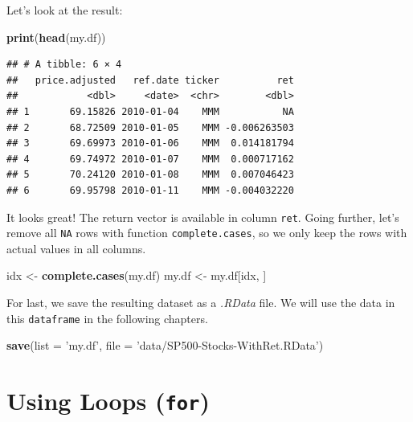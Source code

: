 \documentclass[11pt,]{book}
\newenvironment{Shaded}{\begin{snugshade}}{\end{snugshade}}
\newcommand{\KeywordTok}[1]{\textcolor[rgb]{0.27,0.27,0.27}{\textbf{#1}}}
\newcommand{\DataTypeTok}[1]{\textcolor[rgb]{0.27,0.27,0.27}{#1}}
\newcommand{\StringTok}[1]{\textcolor[rgb]{0.5,0.5,0.5}{#1}}
\newcommand{\NormalTok}[1]{#1}
\begin{document}
Let's look at the result:

\begin{Shaded}
\begin{Highlighting}[]
\KeywordTok{print}\NormalTok{(}\KeywordTok{head}\NormalTok{(my.df))}
\end{Highlighting}
\end{Shaded}

\begin{verbatim}
## # A tibble: 6 × 4
##   price.adjusted   ref.date ticker          ret
##            <dbl>     <date>  <chr>        <dbl>
## 1       69.15826 2010-01-04    MMM           NA
## 2       68.72509 2010-01-05    MMM -0.006263503
## 3       69.69973 2010-01-06    MMM  0.014181794
## 4       69.74972 2010-01-07    MMM  0.000717162
## 5       70.24120 2010-01-08    MMM  0.007046423
## 6       69.95798 2010-01-11    MMM -0.004032220
\end{verbatim}

It looks great! The return vector is available in column \texttt{ret}.
Going further, let's remove all \texttt{NA} rows with function
\texttt{complete.cases}, so we only keep the rows with actual values in
all columns. 

\begin{Shaded}
\begin{Highlighting}[]
\NormalTok{idx <-}\StringTok{ }\KeywordTok{complete.cases}\NormalTok{(my.df)}
\NormalTok{my.df <-}\StringTok{ }\NormalTok{my.df[idx, ]}
\end{Highlighting}
\end{Shaded}

For last, we save the resulting dataset as a \emph{.RData} file. We will
use the data in this \texttt{dataframe} in the following chapters.

\begin{Shaded}
\begin{Highlighting}[]
\KeywordTok{save}\NormalTok{(}\DataTypeTok{list =} \StringTok{'my.df'}\NormalTok{, }
     \DataTypeTok{file =} \StringTok{'data/SP500-Stocks-WithRet.RData'}\NormalTok{)}
\end{Highlighting}
\end{Shaded}

\section{\texorpdfstring{Using Loops
(\texttt{for})}{Using Loops (for)}}\label{using-loops-for}
\end{document}
